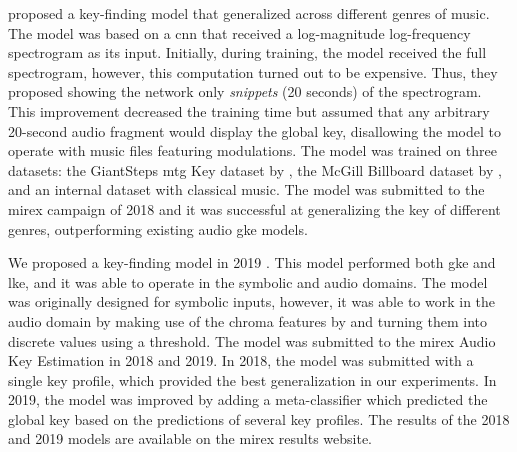 \textcite{korzeniowski2018genreagnostic} proposed a
key-finding model that generalized across different genres
of music. The model was based on a \gls{cnn} that received a
log-magnitude log-frequency spectrogram as its input.
Initially, during training, the model received the full
spectrogram, however, this computation turned out to be
expensive. Thus, they proposed showing the network only
\emph{snippets} (20 seconds) of the spectrogram. This
improvement decreased the training time but assumed that any
arbitrary 20-second audio fragment would display the global
key, disallowing the model to operate with music files
featuring modulations. The model was trained on three
datasets: the GiantSteps \gls{mtg} Key dataset by
\textcite{faraldo2016key}, the McGill Billboard dataset by
\textcite{burgoyne2011expert}, and an internal dataset with
classical music. The model was submitted to the \gls{mirex}
campaign of 2018 and it was successful at generalizing the
key of different genres, outperforming existing audio
\gls{gke} models.


We proposed a key-finding model in 2019
\parencite{napoleslopez2019keyfinding}. This model performed
both \gls{gke} and \gls{lke}, and it was able to operate in
the symbolic and audio domains. The model was originally
designed for symbolic inputs, however, it was able to work
in the audio domain by making use of the chroma features by
\textcite{mauch2010approximate} and turning them into
discrete values using a threshold. The model was submitted
to the \gls{mirex} Audio Key Estimation in 2018 and 2019. In
2018, the model was submitted with a single key profile,
which provided the best generalization in our experiments.
In 2019, the model was improved by adding a meta-classifier
which predicted the global key based on the predictions of
several key profiles. The results of the
2018
and
2019
models are available on the \gls{mirex} results website.

